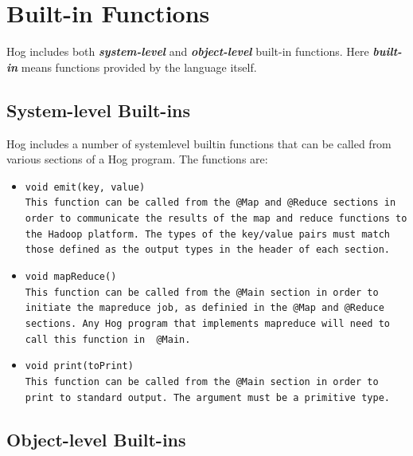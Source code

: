 \documentclass{report}
\begin{document}
\section{Built-in Functions} %
\label{sec:built_in_functions}

Hog includes both \emph{\textbf{system-level}} and \emph{\textbf{object-level}}
built-in functions. Here \emph{\textbf{built-in}} means functions provided by the
language itself.

\subsection{System-level Built-ins} %
\label{sub:system_level_built_ins}

Hog includes a number of system­level built­in functions that can be called from
various sections of a Hog program. The functions are:

\begin{itemize} 

\item[] \tt void emit(key, value) \rm \\

This function can be called from the \tt @Map \rm and \tt @Reduce \rm sections in
order to communicate the results of the map and reduce functions to the Hadoop
platform. The types of the key/value pairs must match those defined as the output
types in the header of each section.

\item[] \tt void mapReduce() \rm \\

This function can be called from the \tt @Main \rm section in order to initiate
the mapreduce job, as definied in the \tt @Map \rm and \tt @Reduce \rm sections.
Any Hog program that implements mapreduce will need to call this function in \tt
@Main\rm.

\item[] \tt void print(toPrint) \rm \\

This function can be called from the \tt @Main \rm section in order to print to
standard output. The argument must be a primitive type.

\end{itemize}


\subsection{Object-level Built-ins} %
\label{sub:object_level_built_ins}
\end{document}
